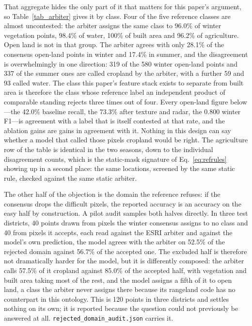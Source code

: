 \documentclass[conference]{IEEEtran}
\begin{document}
That aggregate hides the only part of it that matters for this paper's argument, so Table~\ref{tab_arbiter} gives it by class. Four of the five reference classes are almost uncontested: the arbiter assigns the same class to 96.0\% of winter vegetation points, 98.4\% of water, 100\% of built area and 96.2\% of agriculture. Open land is not in that group. The arbiter agrees with only 28.1\% of the consensus open-land points in winter and 17.4\% in summer, and the disagreement is overwhelmingly in one direction: 319 of the 580 winter open-land points and 337 of the summer ones are called cropland by the arbiter, with a further 59 and 93 called water. The class this paper's feature stack exists to separate from built area is therefore the class whose reference label an independent product of comparable standing rejects three times out of four. Every open-land figure below---the 42.0\% baseline recall, the 73.3\% after texture and radar, the 0.800 winter F1---is agreement with a label that is itself contested at that rate, and the ablation gains are gains in agreement with it. Nothing in this design can say whether a model that called those pixels cropland would be right. The agriculture row of the table is identical in the two seasons, down to the individual disagreement counts, which is the static-mask signature of Eq.~\eqref{eq:refrules} showing up in a second place: the same locations, screened by the same static rule, checked against the same static arbiter.

The other half of the objection is the domain the reference refuses: if the consensus drops the difficult pixels, the reported accuracy is an accuracy on the easy half by construction. A pilot audit samples both halves directly. In three test districts, 40 points drawn from pixels the winter consensus assigns to no class and 40 from pixels it accepts, each read against the ESRI arbiter and against the model's own prediction, the model agrees with the arbiter on 52.5\% of the rejected domain against 56.7\% of the accepted one. The excluded half is therefore not dramatically harder for the model, but it is differently composed: the arbiter calls 57.5\% of it cropland against 85.0\% of the accepted half, with vegetation and built area taking most of the rest, and the model assigns a fifth of it to open land, a class the arbiter never assigns there because its rangeland code has no counterpart in this ontology. This is 120 points in three districts and settles nothing on its own; it is reported because the question could not previously be answered at all. \texttt{rejected\_domain\_audit.json} carries it.
\end{document}
